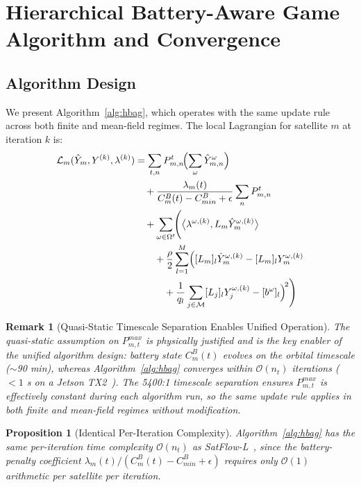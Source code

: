 \documentclass[journal]{IEEEtran}
\newtheorem{proposition}{Proposition}
\newtheorem{remark}{Remark}
\newcommand{\CB}{C^{B}}
\newcommand{\CBmin}{C^{B}_{min}}
\newcommand{\calM}{\mathcal{M}}
\begin{document}
\section{Hierarchical Battery-Aware Game Algorithm and Convergence}
\label{sec:algorithm}

\subsection{Algorithm Design}

We present Algorithm~\ref{alg:hbag}, which operates with the same update rule across both finite and mean-field regimes. The local Lagrangian for satellite $m$ at iteration $k$ is:
\begin{align}
    \mathcal{L}_m(\hat{Y}_m,Y^{(k)},\lambda^{(k)})
    &= \sum_{t,n} P_{m,n}^t\!\Bigl(\sum_{\omega}
    \hat{Y}_{m,n}^{\omega}\Bigr)
    \notag\\
    &\quad+
    \frac{\lambda_m(t)}{\CB_m(t)-\CBmin+\epsilon}
    \sum_{n} P_{m,n}^t
    \notag\\
    &\quad+
    \sum_{\omega\in\Omega^t}\!\Biggl(
    \bigl\langle
    \lambda^{\omega,(k)},
    L_m\hat{Y}_m^{\omega,(k)}
    \bigr\rangle
    \notag\\
    &\qquad+
    \frac{\rho}{2}\sum_{l=1}^{M}
    \Bigl(
    [L_m]_l\hat{Y}_m^{\omega,(k)}
    - [L_m]_l Y_m^{\omega,(k)}
    \notag\\
    &\qquad\quad+
    \frac{1}{q_l}\sum_{j\in\calM}
    [L_j]_l Y_j^{\omega,(k)}
    - [b^\omega]_l
    \Bigr)^{\!2}
    \Biggr)
    \label{eq:lagrangian_ea}
\end{align}

\begin{remark}[Quasi-Static Timescale Separation Enables Unified Operation]
\label{rem:timescale}
The quasi-static assumption on $P_{m,t}^{max}$ is physically justified and is the key enabler of the unified algorithm design: battery state $\CB_m(t)$ evolves on the orbital timescale ($\sim$90 min), whereas Algorithm~\ref{alg:hbag} converges within $\mathcal{O}(n_t)$ iterations ($<1$ s on a Jetson TX2~\cite{cen2024satflow}). The 5400:1 timescale separation ensures $P_{m,t}^{max}$ is effectively constant during each algorithm run, so the same update rule applies in both finite and mean-field regimes without modification.
\end{remark}

\begin{proposition}[Identical Per-Iteration Complexity]
\label{prop:complexity}
Algorithm~\ref{alg:hbag} has the same per-iteration time complexity $\mathcal{O}(n_t)$ as SatFlow-L~\cite{cen2024satflow}, since the battery-penalty coefficient $\lambda_m(t)/(\CB_m(t)-\CBmin+\epsilon)$ requires only $\mathcal{O}(1)$ arithmetic per satellite per iteration.
\end{proposition}
\end{document}
